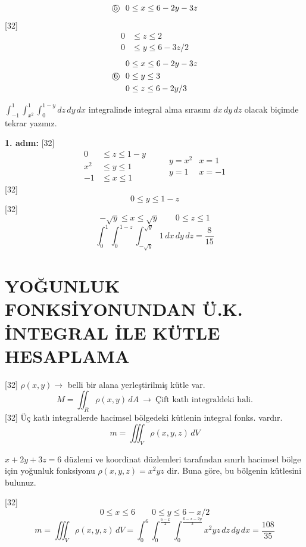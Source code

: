 \documentclass[11pt,a4paper]{article}
\begin{document}
\[ \text{\textcircled{5}}\ \ 0\le x\le6-2y-3z \]
[32]
\[ \begin{aligned}0&\le z\le2\\0&\le y\le6-3z/2\end{aligned} \]
\[ \text{\textcircled{6}}\ \ \begin{aligned}0&\le x\le6-2y-3z\\0&\le y\le3\\0&\le z\le6-2y/3\end{aligned} \]
\begin{ornek}
$\displaystyle\int_{-1}^{1}\int_{x^2}^{1}\int_0^{1-y}dz\,dy\,dx$ integralinde integral alma sırasını $dx\,dy\,dz$ olacak biçimde tekrar yazınız.
\end{ornek}
\noindent\textbf{1. adım:}
[32]
\[ \begin{aligned}0&\le z\le1-y\\x^2&\le y\le1\\-1&\le x\le1\end{aligned}\qquad \begin{array}{l|l}y=x^2&x=1\\y=1&x=-1\end{array} \]
[32]
\[ 0\le y\le1-z \]
[32]
\[ -\sqrt y\le x\le\sqrt y\qquad 0\le z\le1 \]
\[ \int_0^1\int_0^{1-z}\int_{-\sqrt y}^{\sqrt y}1\,dx\,dy\,dz=\frac{8}{15} \]

\section{YOĞUNLUK FONKSİYONUNDAN Ü.K. İNTEGRAL İLE KÜTLE HESAPLAMA}
[32]
\noindent$\rho(x,y)\longrightarrow$ belli bir alana yerleştirilmiş kütle var.
\[ M=\iint_R\rho(x,y)\,dA\ \longrightarrow\ \text{Çift katlı integraldeki hali.} \]
[32]
\noindent Üç katlı integrallerde hacimsel bölgedeki kütlenin integral fonks. vardır.
\[ m=\iiint_V\rho(x,y,z)\,dV \]
\begin{ornek}
$x+2y+3z=6$ düzlemi ve koordinat düzlemleri tarafından sınırlı hacimsel bölge için yoğunluk fonksiyonu $\rho(x,y,z)=x^2yz$ dir. Buna göre, bu bölgenin kütlesini bulunuz.
\end{ornek}
[32]
\[ 0\le x\le6\qquad 0\le y\le6-x/2 \]
\[ m=\iiint_V\rho(x,y,z)\,dV=\int_0^6\int_0^{\frac{6-x}{2}}\int_0^{\frac{6-x-2y}{3}}x^2yz\,dz\,dy\,dx=\frac{108}{35} \]
\end{document}
